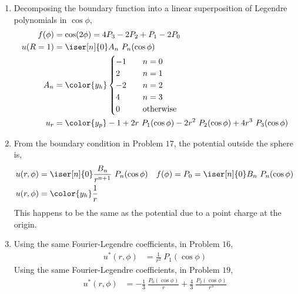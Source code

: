 \begin{enumerate}
    \item Decomposing the boundary function into a linear superposition of
          Legendre polynomials in $ \cos\phi $,
          \begin{align}
              f(\phi) & = \cos(2\phi) = 4P_3 - 2P_2 + P_1 - 2P_0                   \\
              u(R=1)  & = \iser[n]{0} A_n\ P_n(\cos\phi)                           \\
              A_n     & = \color{y_h} \begin{cases}
                                          -1 & \quad n = 0            \\
                                          2  & \quad n = 1            \\
                                          -2 & \quad n = 2            \\
                                          4  & \quad n = 3            \\
                                          0  & \quad \text{otherwise}
                                      \end{cases}                  \\
              u_r     & = \color{y_p} -1 + 2r\ P_1(\cos\phi) - 2r^2\ P_2(\cos\phi)
              + 4r^3\ P_3(\cos\phi)
          \end{align}

    \item From the boundary condition in Problem $ 17 $, the potential outside the
          sphere is,
          \begin{align}
              u(r, \phi) & = \iser[n]{0} \frac{B_n}{r^{n+1}}\ P_n(\cos\phi) &
              f(\phi)    & = P_0 = \iser[n]{0} B_n\ P_n(\cos\phi)             \\
              u(r, \phi) & = \color{y_h} \frac{1}{r}
          \end{align}
          This happens to be the same as the potential due to a point charge at the
          origin.

    \item  Using the same Fourier-Legendre coefficients, in Problem $ 16 $,
          \begin{align}
              u^*(r, \phi) & = \frac{1}{r^2}\ P_1(\cos\phi)
          \end{align}
          Using the same Fourier-Legendre coefficients, in Problem $ 19 $,
          \begin{align}
              u^*(r, \phi) & = -\frac{1}{3}\ \frac{P_0(\cos\phi)}{r} + \frac{4}{3}
              \ \frac{P_2(\cos\phi)}{r^3}
          \end{align}


\end{enumerate}
